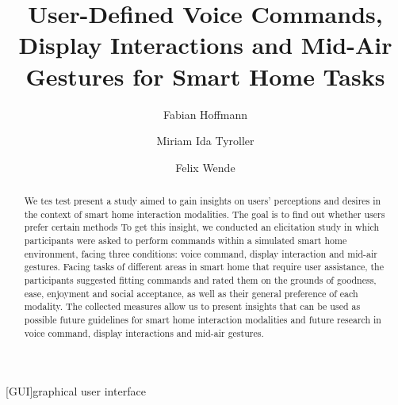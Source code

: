 \documentclass[sigchi]{acmart}
\begin{document}
	\begin{acronym}
	[GUI]{graphical user interface}
	\end{acronym}
	
	\title{User-Defined Voice Commands, Display Interactions and Mid-Air Gestures for Smart Home Tasks}
	
	\author{Fabian Hoffmann}
	
	\author{Miriam Ida Tyroller}
	
	\author{Felix Wende}
	
	
	\begin{abstract}
		We tes test present a study aimed to gain insights on users' perceptions and desires in the context of smart home interaction modalities. The goal is to find out whether users prefer certain methods To get this insight, we conducted an elicitation study in which participants were asked to perform commands within a simulated smart home environment, facing three conditions: voice command, display interaction and mid-air gestures. Facing tasks of different areas in smart home that require user assistance, the participants suggested fitting commands and rated them on the grounds of goodness, ease, enjoyment and social acceptance, as well as their general preference of each modality. The collected measures allow us to present insights that can be used as possible future guidelines for smart home interaction modalities and future research in voice command, display interactions and mid-air gestures.
	\end{abstract}
	
\end{document}
